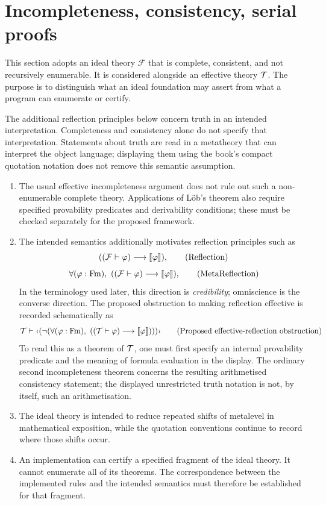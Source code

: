\section{Incompleteness, consistency, serial proofs}
This section adopts an ideal theory $\mathcal{F}$ that is complete,
consistent, and not recursively enumerable. It is considered alongside an
effective theory $\mathcal{T}$. The purpose is to distinguish what an ideal
foundation may assert from what a program can enumerate or certify.

The additional reflection principles below concern truth in an intended
interpretation. Completeness and consistency alone do not specify that
interpretation. Statements about truth are read in a metatheory that can
interpret the object language; displaying them using the book's compact
quotation notation does not remove this semantic assumption.


\begin{enumerate}
\item The usual effective incompleteness argument does not rule out such a
non-enumerable complete theory. Applications of L\"ob's theorem also require
specified provability predicates and derivability conditions; these must be
checked separately for the proposed framework.

\item The intended semantics additionally motivates reflection principles such as
\[
(({\mathcal{F}} \vdash \varphi) \longrightarrow \llbracket \varphi\rrbracket),
\tag{Reflection}
\]
\[
\forall (\phi:\Fm),\ %
((\Fau \vdash \phi) \implies \mantiquote{\phi}),
\tag{MetaReflection}
\]%
In the terminology used later, this direction is \emph{credibility};
omniscience is the converse direction. The proposed obstruction to making
reflection effective is recorded schematically as
\[
\Tau \vdash
\mquote{
(
\neg (\forall (\phi:\Fm),\ %
((\Tau \vdash \phi) \implies \mantiquote{\phi})
))
}
\tag{Proposed effective-reflection obstruction}
\]
To read this as a theorem of $\mathcal{T}$, one must first specify an internal
provability predicate and the meaning of formula evaluation in the display.
The ordinary second incompleteness theorem concerns the resulting
arithmetised consistency statement; the displayed unrestricted truth
notation is not, by itself, such an arithmetisation.



\item The ideal theory is intended to reduce repeated shifts of metalevel in
mathematical exposition, while the quotation conventions continue to record
where those shifts occur.

\item An implementation can certify a specified fragment of the ideal theory.
It cannot enumerate all of its theorems. The correspondence between the
implemented rules and the intended semantics must therefore be established
for that fragment.
\end{enumerate}


